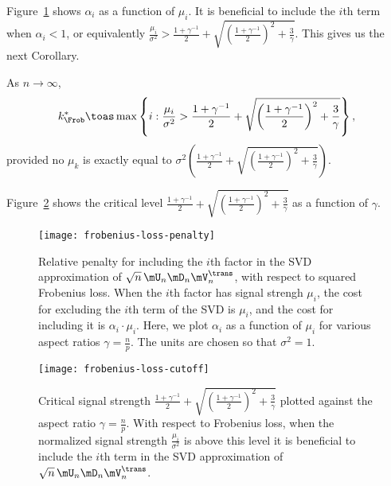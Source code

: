 Figure~\ref{F:frobenius-loss-penalty} shows $\alpha_i$ as a function of
$\mu_i$.  It is beneficial to include the $i$th term when $\alpha_i < 1$,
or equivalently
\(
    \frac{\mu_i}{\sigma^2}
    >
    \frac{1 + \gamma^{-1}}{2}
    +
    \sqrt{ 
        \left( \frac{1 + \gamma^{-1} }{2} \right)^2
        +
        \frac{3}{\gamma}
    }.
\)
This gives us the next Corollary.

\begin{corollary}
    As $n\to\infty$,
    \[
        k^\ast_\Frob
            \toas
                \max \left\{ i : 
                    \frac{\mu_i}{\sigma^2}
                        >  
                            \frac{1 + \gamma^{-1}}{2}
                            +
                            \sqrt{ 
                                \left( \frac{1 + \gamma^{-1} }{2} \right)^2
                                +
                                \frac{3}{\gamma}
                            }
                \right\},
    \]
    provided no $\mu_k$ is exactly equal to
    \(
        \sigma^2
        \left(
            \frac{1 + \gamma^{-1}}{2}
            +
            \sqrt{ 
                \left( \frac{1 + \gamma^{-1} }{2} \right)^2
                +
                \frac{3}{\gamma}
            }
        \right).
    \)
\end{corollary}

\noindent
Figure~\ref{F:frobenius-loss-cutoff} shows the critical level
\(
    \frac{1 + \gamma^{-1}}{2}
    +
    \sqrt{ 
        \left( \frac{1 + \gamma^{-1} }{2} \right)^2
        +
        \frac{3}{\gamma}
    }
\)
as a function of $\gamma$.

\begin{figure}[tbh]
    \centering
    \texttt{[image: frobenius-loss-penalty]}
    \caption{
        Relative penalty for including the $i$th factor in the SVD 
        approximation of $\sqrt{n} \, \mU_n \mD_n \mV_n^\trans$, with
        respect to squared Frobenius loss.  When the $i$th factor
        has signal strengh $\mu_i$, the cost for excluding the $i$th term
        of the SVD is $\mu_i$, and the cost for including it is 
        $\alpha_i \cdot \mu_i$.  Here, we plot $\alpha_i$ as a function
        of $\mu_i$ for various aspect ratios $\gamma = \frac{n}{p}$.
        The units are chosen so that $\sigma^2 = 1$.
    }\label{F:frobenius-loss-penalty}
\end{figure}
\begin{figure}[hbt]
    \centering
    \texttt{[image: frobenius-loss-cutoff]}
    \caption{
        Critical signal strength
        \(
            \frac{1 + \gamma^{-1}}{2}
            +
            \sqrt{
                \left( \frac{1 + \gamma^{-1} }{2} \right)^2
                +
                \frac{3}{\gamma}
            }
        \)
        plotted against the aspect ratio $\gamma = \frac{n}{p}$.  With
        respect to Frobenius loss, when the normalized signal strength 
        $\frac{\mu_i}{\sigma^2}$ is above this level it is beneficial to 
        include the $i$th term in the SVD approximation of 
        $\sqrt{n} \, \mU_n \mD_n \mV_n^\trans$.
    }\label{F:frobenius-loss-cutoff}
\end{figure}
